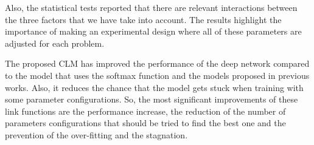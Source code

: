 \documentclass[journal]{IEEEtran}
\begin{document}
	Also, the statistical tests reported that there are relevant interactions between the three factors that we have take into account. The results highlight the importance of making an experimental design where all of these parameters are adjusted for each problem.
	
	The proposed CLM has improved the performance of the deep network compared to the model that uses the softmax function and the models proposed in previous works. Also, it reduces the chance that the model gets stuck when training with some parameter configurations. So, the most significant improvements of these link functions are the performance increase, the reduction of the number of parameters configurations that should be tried to find the best one and the prevention of the over-fitting and the stagnation.

	
	
	
	

	
	
	\ifCLASSOPTIONcaptionsoff
	\newpage
	\fi
	
	
\end{document}
